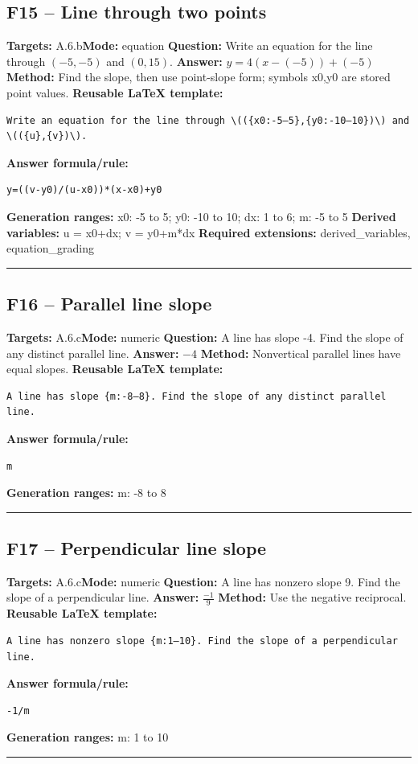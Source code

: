 \documentclass[11pt]{article}
\begin{document}
\subsection{F15 -- Line through two points}
\textbf{Targets:} A.6.b\quad\textbf{Mode:} equation
\textbf{Question:} Write an equation for the line through \((-5,-5)\) and \((0,15)\).
\textbf{Answer:} \(y=4(x-(-5))+(-5)\)
\textbf{Method:} Find the slope, then use point-slope form; symbols x0,y0 are stored point values.
\textbf{Reusable LaTeX template:}
\begin{verbatim}
Write an equation for the line through \(({x0:-5–5},{y0:-10–10})\) and \(({u},{v})\).
\end{verbatim}
\textbf{Answer formula/rule:}
\begin{verbatim}
y=((v-y0)/(u-x0))*(x-x0)+y0
\end{verbatim}
\textbf{Generation ranges:} x0: -5 to 5; y0: -10 to 10; dx: 1 to 6; m: -5 to 5
\textbf{Derived variables:} u = x0+dx; v = y0+m*dx
\textbf{Required extensions:} derived\_variables, equation\_grading
\medskip\hrule\medskip
\subsection{F16 -- Parallel line slope}
\textbf{Targets:} A.6.c\quad\textbf{Mode:} numeric
\textbf{Question:} A line has slope -4. Find the slope of any distinct parallel line.
\textbf{Answer:} \(-4\)
\textbf{Method:} Nonvertical parallel lines have equal slopes.
\textbf{Reusable LaTeX template:}
\begin{verbatim}
A line has slope {m:-8–8}. Find the slope of any distinct parallel line.
\end{verbatim}
\textbf{Answer formula/rule:}
\begin{verbatim}
m
\end{verbatim}
\textbf{Generation ranges:} m: -8 to 8
\medskip\hrule\medskip
\subsection{F17 -- Perpendicular line slope}
\textbf{Targets:} A.6.c\quad\textbf{Mode:} numeric
\textbf{Question:} A line has nonzero slope 9. Find the slope of a perpendicular line.
\textbf{Answer:} \(\frac{-1}{9}\)
\textbf{Method:} Use the negative reciprocal.
\textbf{Reusable LaTeX template:}
\begin{verbatim}
A line has nonzero slope {m:1–10}. Find the slope of a perpendicular line.
\end{verbatim}
\textbf{Answer formula/rule:}
\begin{verbatim}
-1/m
\end{verbatim}
\textbf{Generation ranges:} m: 1 to 10
\medskip\hrule\medskip
\end{document}
